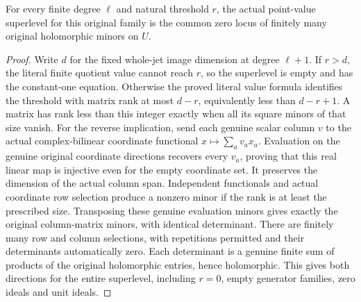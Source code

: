 \begin{theorem}
\label{hir:actual-hilbert-samuel-point-value-minor-loci}
\leanok
{}
For every finite degree $\ell$ and natural threshold $r$, the actual
point-value superlevel for this original family is the common zero locus
of finitely many original holomorphic minors on $U$.
\end{theorem}
\begin{proof}
Write $d$ for the fixed whole-jet image dimension at degree $\ell+1$.
If $r>d$, the literal finite quotient value cannot reach $r$, so the
superlevel is empty and has the constant-one equation. Otherwise the
proved literal value formula identifies the threshold with matrix rank
at most $d-r$, equivalently less than $d-r+1$. A matrix has rank less
than this integer exactly when all its square minors of that size vanish.
For the reverse implication, send each genuine scalar column $v$ to the
actual complex-bilinear coordinate functional $x\mapsto\sum_a v_a x_a$.
Evaluation on the genuine original coordinate directions recovers every
$v_a$, proving that this real linear map is injective even for the empty
coordinate set. It preserves the dimension of the actual column span.
Independent functionals and actual coordinate row selection produce a
nonzero minor if the rank is at least the prescribed size. Transposing
these genuine evaluation minors gives exactly the original column-matrix
minors, with identical determinant.
There are finitely many row and column selections, with repetitions
permitted and their determinants automatically zero. Each determinant
is a genuine finite sum of products of the original holomorphic entries,
hence holomorphic. This gives both directions for the entire superlevel,
including $r=0$, empty generator families, zero ideals and unit ideals.
\end{proof}

